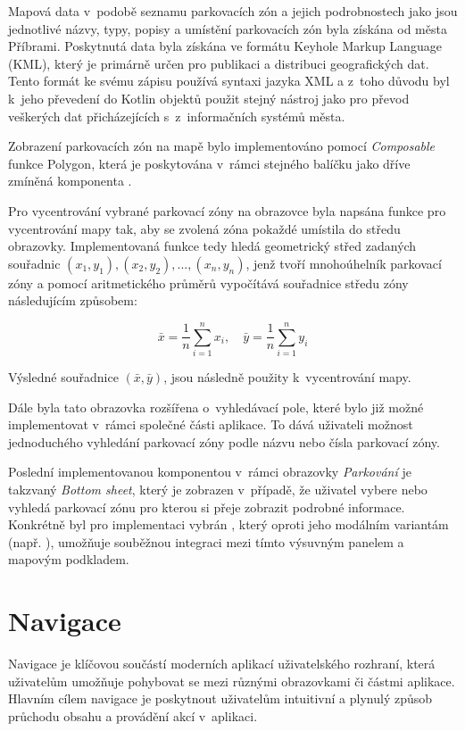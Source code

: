 Mapová data v~podobě seznamu parkovacích zón a jejich podrobnostech jako jsou jednotlivé názvy, typy, popisy a umístění parkovacích zón byla 
získána od města Příbrami. Poskytnutá data byla získána ve formátu Keyhole Markup Language (KML), který je primárně určen pro publikaci a 
distribuci geografických dat. Tento formát ke svému zápisu používá syntaxi jazyka XML a z~toho důvodu byl k~jeho převedení do Kotlin objektů 
použit stejný nástroj jako pro převod veškerých dat přicházejících s~z~informačních systémů města.

Zobrazení parkovacích zón na mapě bylo implementováno pomocí \textit{Composable} funkce Polygon, která je poskytována v~rámci stejného balíčku 
jako dříve zmíněná komponenta .

Pro vycentrování vybrané parkovací zóny na obrazovce byla napsána funkce pro vycentrování mapy tak, aby se zvolená zóna pokaždé 
umístila do středu obrazovky. Implementovaná funkce tedy hledá geometrický střed zadaných souřadnic \( (x_1, y_1), (x_2, y_2), ..., (x_n, y_n)\), 
jenž tvoří mnohoúhelník parkovací zóny a pomocí aritmetického průměrů vypočítává souřadnice středu zóny následujícím způsobem:

\[
\bar{x} = \frac{1}{n} \sum_{i=1}^{n} x_i, \quad \bar{y} = \frac{1}{n} \sum_{i=1}^{n} y_i
\]

Výsledné souřadnice $(\bar{x},\bar{y})$, jsou následně použity k~vycentrování mapy.

\bigskip

Dále byla tato obrazovka rozšířena o~vyhledávací pole, které bylo již možné implementovat v~rámci společné části aplikace. 
To dává uživateli možnost jednoduchého vyhledání parkovací zóny podle názvu nebo čísla parkovací zóny.

Poslední implementovanou komponentou v~rámci obrazovky \textit{Parkování} je takzvaný \textit{Bottom sheet}, který je zobrazen v~případě, 
že uživatel vybere nebo vyhledá parkovací zónu pro kterou si přeje zobrazit podrobné informace. Konkrétně byl pro implementaci vybrán 
, který oproti jeho modálním variantám (např. ), umožňuje souběžnou integraci mezi tímto
 výsuvným panelem a mapovým podkladem.


\section{Navigace}
Navigace je klíčovou součástí moderních aplikací uživatelského rozhraní, která uživatelům umožňuje pohybovat se mezi různými obrazovkami či 
částmi aplikace. Hlavním cílem navigace je poskytnout uživatelům intuitivní a plynulý způsob průchodu obsahu a provádění akcí v~aplikaci. 

